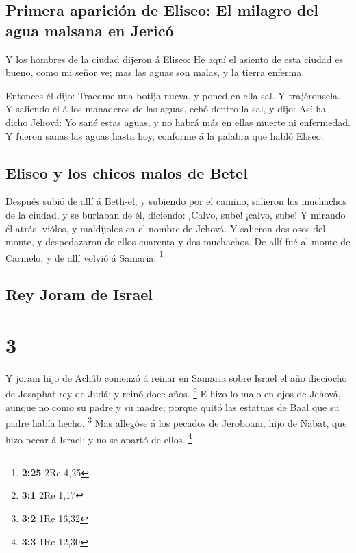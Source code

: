 \hypertarget{primera-apariciuxf3n-de-eliseo-el-milagro-del-agua-malsana-en-jericuxf3}{%
\subsection{Primera aparición de Eliseo: El milagro del agua malsana en
Jericó}\label{primera-apariciuxf3n-de-eliseo-el-milagro-del-agua-malsana-en-jericuxf3}}

 Y los hombres de la ciudad dijeron á Eliseo: He aquí el
asiento de esta ciudad es bueno, como mi señor ve; mas las aguas son
malas, y la tierra enferma.

 Entonces él dijo: Traedme una botija nueva, y poned en
ella sal. Y trajéronsela.  Y saliendo él á los manaderos de
las aguas, echó dentro la sal, y dijo: Así ha dicho Jehová: Yo sané
estas aguas, y no habrá más en ellas muerte ni enfermedad. 
Y fueron sanas las aguas hasta hoy, conforme á la palabra que habló
Eliseo.

\hypertarget{eliseo-y-los-chicos-malos-de-betel}{%
\subsection{Eliseo y los chicos malos de
Betel}\label{eliseo-y-los-chicos-malos-de-betel}}

 Después subió de allí á Beth-el; y subiendo por el camino,
salieron los muchachos de la ciudad, y se burlaban de él, diciendo:
¡Calvo, sube! ¡calvo, sube!  Y mirando él atrás, viólos, y
maldíjolos en el nombre de Jehová. Y salieron dos osos del monte, y
despedazaron de ellos cuarenta y dos muchachos.  De allí
fué al monte de Carmelo, y de allí volvió á Samaria. \footnote{\textbf{2:25}
  2Re 4,25}

\hypertarget{rey-joram-de-israel}{%
\subsection{Rey Joram de Israel}\label{rey-joram-de-israel}}

\hypertarget{section-2}{%
\section{3}\label{section-2}}

 Y joram hijo de Achâb comenzó á reinar en Samaria sobre
Israel el año dieciocho de Josaphat rey de Judá; y reinó doce años.
\footnote{\textbf{3:1} 2Re 1,17}  E hizo lo malo en ojos de
Jehová, aunque no como su padre y su madre; porque quitó las estatuas de
Baal que su padre había hecho. \footnote{\textbf{3:2} 1Re 16,32}
 Mas allegóse á los pecados de Jeroboam, hijo de Nabat, que
hizo pecar á Israel; y no se apartó de ellos. \footnote{\textbf{3:3} 1Re
  12,30}

